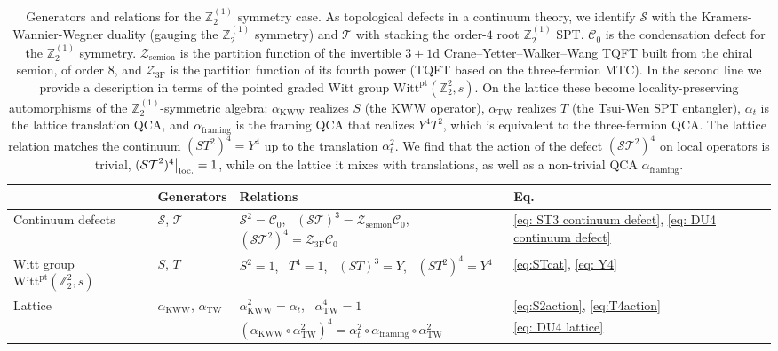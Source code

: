 \documentclass[aps,twocolumn,prx,floatfix,preprintnumbers, nofootinbib,10pt]{revtex4-2}
\numberwithin{equation}{section}
\theoremstyle{definition}
\theoremstyle{remark}
\theoremstyle{claim}
\newcommand{\aKWW}{\alpha_\text{KWW}}
\newcommand{\aTW}{\alpha_\text{TW}}
\newcommand{\Z}{{\mathbb Z}}
\newcommand{\Witt}{\text{Witt}}
\newcommand{\pt}{\text{pt}}
\newcommand{\mc}[1]{\mathcal{#1}}
\newcommand\restr[2]{{%
  \left.\kern-\nulldelimiterspace %
  #1 %
  \right|_{#2} %
}}
\newcommand{\opaction}[1]{\restr{#1}{\text{loc.}}}
\begin{document}
\begin{table}[t]
\centering
\renewcommand{\arraystretch}{1.4}
\begin{tabular}{@{}l |l| l| l@{}}
\toprule
 & Generators & Relations & Eq. \\
\midrule
Continuum defects
  & $\mc{S}$, $\mc{T}$
  & {$\mc{S}^2 = \mc{C}_0$}, \ $(\mc{ST})^3 = \mc{Z}_\text{semion} \mc{C}_0$, \ $(\mc{ST}^2)^4 = \mc{Z}_\text{3F} \mc{C}_0$
  & \eqref{eq: ST3 continuum defect}, \eqref{eq: DU4 continuum defect} \\
Witt group $\Witt^\pt (\Z_2^2, s)$ 
  & $S$, $T$
  & $S^2=1$, \ $T^4=1$, \ $(ST)^3=Y$, \ $(ST^2)^4 = Y^4$
  & \eqref{eq:STcat}, \eqref{eq: Y4} \\
Lattice
  & $\aKWW$, $\aTW$
  & $\aKWW^2 = \alpha_t$, \ $\aTW^4 = 1$ 
  & \eqref{eq:S2action}, \eqref{eq:T4action}  \\
  &
  & $(\aKWW \circ \aTW^2)^4=\alpha_t^2 \circ \alpha_{\mathrm{framing}} \circ \aTW^2$
  & \eqref{eq: DU4 lattice} \\
\bottomrule
\end{tabular}
\caption{Generators and relations for the $\Z_2^{(1)}$ symmetry case.
As topological defects in a continuum theory, we identify $\mc{S}$ with the Kramers-Wannier-Wegner duality
(gauging the $\Z_2^{(1)}$ symmetry) and $\mc{T}$ with stacking the order-$4$ root $\Z_2^{(1)}$ SPT. $\mc{C}_0$ is the condensation defect for the $\Z_2^{(1)}$ symmetry.
$\mc{Z}_\text{semion}$ is the partition function of the invertible $3+1$d
Crane--Yetter--Walker--Wang TQFT built from the chiral semion, of order $8$, and
$\mc{Z}_\text{3F}$ is the partition function of its fourth power (TQFT based on the three-fermion MTC). In the second line we provide a description in terms of the pointed graded Witt group $\Witt^{\pt} (\Z_2^2, s)$.
On the lattice these become locality-preserving automorphisms of the
$\Z_2^{(1)}$-symmetric algebra: $\aKWW$ realizes $S$ (the KWW operator), $\aTW$
realizes $T$ (the Tsui-Wen SPT entangler), $\alpha_t$ is the lattice translation
QCA, and $\alpha_{\mathrm{framing}}$ is the framing QCA that realizes $Y^4 T^2$, which is equivalent to the three-fermion QCA. The lattice relation matches the continuum $(ST^2)^4=Y^4$
up to the translation $\alpha_t^2$.  We find that the action of the defect $(\mc{ST}^2)^4$ on local operators is trivial, $\opaction{(\mc{ST}^2)^4} = 1$, while on the lattice it mixes with translations, as well as a non-trivial QCA $\alpha_\text{framing}$.
}
\label{tab:p2-relations}
\end{table}
\end{document}
